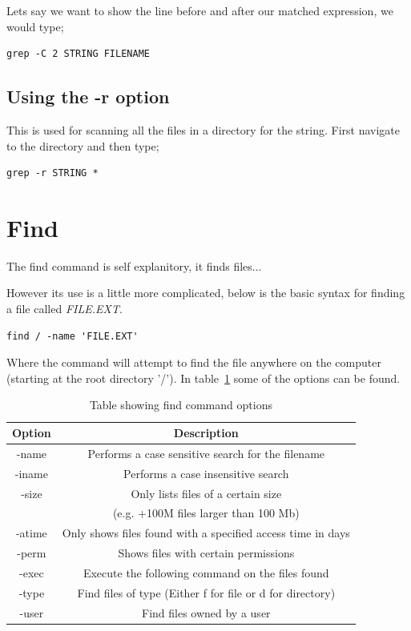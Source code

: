 Lets say we want to show the line before and after our matched expression, we would type;

\begin{lstlisting}
grep -C 2 STRING FILENAME
\end{lstlisting}

\subsection{Using the -r option}

This is used for scanning all the files in a directory for the string.  First navigate to the directory and then type;

\begin{lstlisting}
grep -r STRING *
\end{lstlisting}

\section{Find}

The find command is self explanitory, it finds files...

However its use is a little more complicated, below is the basic syntax for finding a file called \textit{FILE.EXT}.

\begin{lstlisting}
find / -name 'FILE.EXT'
\end{lstlisting}

Where the command will attempt to find the file anywhere on the computer (starting at the root directory '/').  In table~\ref{tab:find} some of the options can be found.

\begin{table}[!th]
\centering
\begin{tabular}{cc}
\hline
Option & Description\\
\hline
-name & Performs a case sensitive search for the filename\\
-iname & Performs a case insensitive search\\
-size & Only lists files of a certain size\\
 & (e.g. +100M files larger than 100 Mb)\\
-atime & Only shows files found with a specified access time in days\\
-perm & Shows files with certain permissions\\
-exec & Execute the following command on the files found\\
-type & Find files of type (Either f for file or d for directory)\\
-user & Find files owned by a user\\
\hline
\end{tabular}
\caption{Table showing find command options}
\label{tab:find}
\end{table}

